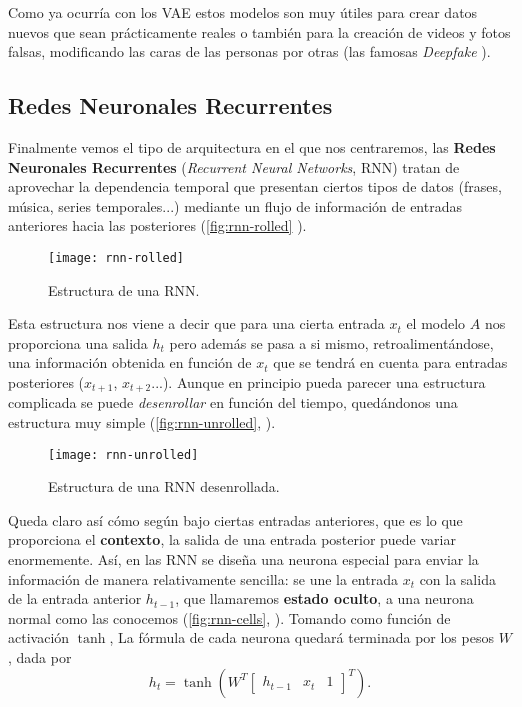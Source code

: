 Como ya ocurría con los VAE estos modelos son muy útiles para crear datos nuevos que sean prácticamente reales o también para la creación de videos y fotos falsas, modificando las caras de las personas por otras (las famosas \emph{Deepfake} \cite{nguyen2020deepfake}).

\subsection{Redes Neuronales Recurrentes}

Finalmente vemos el tipo de arquitectura en el que nos centraremos, las \textbf{Redes Neuronales Recurrentes} (\emph{Recurrent Neural Networks}, RNN) \cite{elman1990finding} tratan de aprovechar la dependencia temporal que presentan ciertos tipos de datos (frases, música, series temporales...) mediante un flujo de información de entradas anteriores hacia las posteriores (\autoref{fig:rnn-rolled} \cite{christopher2015lstm}).

\begin{figure}[htpb]
  \centering
  \texttt{[image: rnn-rolled]}
  \caption{Estructura de una RNN.}
  \label{fig:rnn-rolled}
\end{figure}

Esta estructura nos viene a decir que para una cierta entrada $x_t$ el modelo $A$ nos proporciona una salida $h_t$ pero además se pasa a si mismo, retroalimentándose, una información obtenida en función de $x_t$ que se tendrá en cuenta para entradas posteriores ($x_{t + 1}$, $x_{t + 2}$...). Aunque en principio pueda parecer una estructura complicada se puede \emph{desenrollar} en función del tiempo, quedándonos una estructura muy simple (\autoref{fig:rnn-unrolled}, \cite{christopher2015lstm}).

\begin{figure}[htpb]
  \centering
  \texttt{[image: rnn-unrolled]}
  \caption{Estructura de una RNN desenrollada.}
  \label{fig:rnn-unrolled}
\end{figure}

Queda claro así cómo según bajo ciertas entradas anteriores, que es lo que proporciona el \textbf{contexto}, la salida de una entrada posterior puede variar enormemente. Así, en las RNN se diseña una neurona especial para enviar la información de manera relativamente sencilla: se une la entrada $x_t$ con la salida de la entrada anterior $h_{t-1}$, que llamaremos \textbf{estado oculto}, a una neurona normal como las conocemos (\autoref{fig:rnn-cells}, \cite{christopher2015lstm}). Tomando como función de activación $\tanh$, La fórmula de cada neurona quedará terminada por los pesos $W$, dada por
\begin{equation*}
  h_t = \tanh \left(W^T \begin{bmatrix} h_{t-1} & x_t & 1 \end{bmatrix}^T\right).
  \label{eq:rnn}
\end{equation*}

